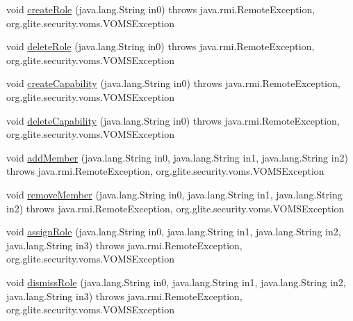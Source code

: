 \begin{DoxyCompactItemize}
\item 
void \hyperlink{classorg_1_1glite_1_1security_1_1voms_1_1service_1_1admin_1_1VOMSAdminSoapBindingImpl_a5eb2d9fe25665077f5b74bbc108d46d7}{createRole} (java.lang.String in0)  throws java.rmi.RemoteException, org.glite.security.voms.VOMSException 
\item 
void \hyperlink{classorg_1_1glite_1_1security_1_1voms_1_1service_1_1admin_1_1VOMSAdminSoapBindingImpl_a29d8f5ecce7bb351d1ffb18adbc7f128}{deleteRole} (java.lang.String in0)  throws java.rmi.RemoteException, org.glite.security.voms.VOMSException 
\item 
void \hyperlink{classorg_1_1glite_1_1security_1_1voms_1_1service_1_1admin_1_1VOMSAdminSoapBindingImpl_ae1a1709e53392528cf190611e1f15a87}{createCapability} (java.lang.String in0)  throws java.rmi.RemoteException, org.glite.security.voms.VOMSException 
\item 
void \hyperlink{classorg_1_1glite_1_1security_1_1voms_1_1service_1_1admin_1_1VOMSAdminSoapBindingImpl_a320ea2969f6209f39dc2d945fc800e92}{deleteCapability} (java.lang.String in0)  throws java.rmi.RemoteException, org.glite.security.voms.VOMSException 
\item 
void \hyperlink{classorg_1_1glite_1_1security_1_1voms_1_1service_1_1admin_1_1VOMSAdminSoapBindingImpl_a0b2349b6e19856cd48dd557dff3b3c75}{addMember} (java.lang.String in0, java.lang.String in1, java.lang.String in2)  throws java.rmi.RemoteException, org.glite.security.voms.VOMSException 
\item 
void \hyperlink{classorg_1_1glite_1_1security_1_1voms_1_1service_1_1admin_1_1VOMSAdminSoapBindingImpl_abe065af732ab135c5844aa5f1d6474b5}{removeMember} (java.lang.String in0, java.lang.String in1, java.lang.String in2)  throws java.rmi.RemoteException, org.glite.security.voms.VOMSException 
\item 
void \hyperlink{classorg_1_1glite_1_1security_1_1voms_1_1service_1_1admin_1_1VOMSAdminSoapBindingImpl_a2685a1f86c6760f7e6425ca947b6d756}{assignRole} (java.lang.String in0, java.lang.String in1, java.lang.String in2, java.lang.String in3)  throws java.rmi.RemoteException, org.glite.security.voms.VOMSException 
\item 
void \hyperlink{classorg_1_1glite_1_1security_1_1voms_1_1service_1_1admin_1_1VOMSAdminSoapBindingImpl_a1559885594ad27e6675e1582f92d59ea}{dismissRole} (java.lang.String in0, java.lang.String in1, java.lang.String in2, java.lang.String in3)  throws java.rmi.RemoteException, org.glite.security.voms.VOMSException 
\item 

\end{DoxyCompactItemize}
